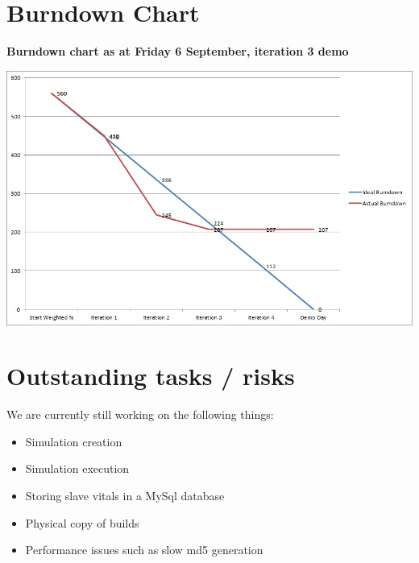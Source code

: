 \documentclass[a4paper,12pt,final]{article}
\begin{document}
\section{Burndown Chart}
\begin{center}
\textbf{Burndown chart as at Friday 6 September, iteration 3 demo\\}
\end{center}
\begin{center}
\includegraphics[scale=0.7]{Burndown.jpg}
\end{center}




\section{Outstanding tasks / risks}
We are currently still working on the following things:
\begin{itemize}
\item Simulation creation
\item Simulation execution
\item Storing slave vitals in a MySql database
\item Physical copy of builds
\item Performance issues such as slow md5 generation
\end{itemize}
\end{document}
